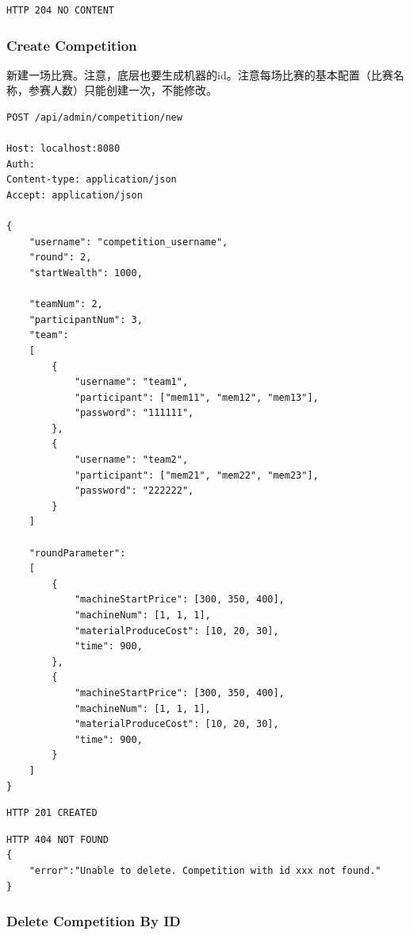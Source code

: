 \documentclass[12pt, a4paper,UTF8]{article}
\begin{document}
\begin{lstlisting}
HTTP 204 NO CONTENT
\end{lstlisting}

\subsubsection{Create Competition}
新建一场比赛。注意，底层也要生成机器的id。注意每场比赛的基本配置（比赛名称，参赛人数）只能创建一次，不能修改。

\begin{lstlisting}
POST /api/admin/competition/new

Host: localhost:8080
Auth:
Content-type: application/json
Accept: application/json

{
    "username": "competition_username",
    "round": 2,
    "startWealth": 1000,

    "teamNum": 2,
    "participantNum": 3,
    "team":
    [
        {
            "username": "team1",
            "participant": ["mem11", "mem12", "mem13"],
            "password": "111111",
        },
        {
            "username": "team2",
            "participant": ["mem21", "mem22", "mem23"],
            "password": "222222",
        }
    ]

    "roundParameter":
    [
        {
            "machineStartPrice": [300, 350, 400],
            "machineNum": [1, 1, 1],
            "materialProduceCost": [10, 20, 30],
            "time": 900,
        },
        {
            "machineStartPrice": [300, 350, 400],
            "machineNum": [1, 1, 1],
            "materialProduceCost": [10, 20, 30],
            "time": 900,
        }
    ]
}
\end{lstlisting}

\begin{lstlisting}
HTTP 201 CREATED

\end{lstlisting}

\begin{lstlisting}
HTTP 404 NOT FOUND
{
    "error":"Unable to delete. Competition with id xxx not found."
}
\end{lstlisting}


\subsubsection{Delete Competition By ID}
\end{document}
